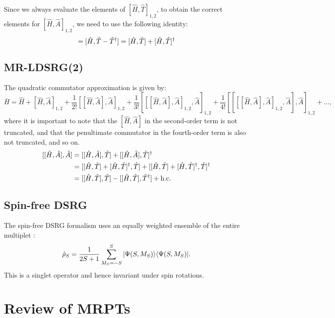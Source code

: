 \documentclass{article}
\begin{document}
Since we always evaluate the elements of $[\hat{H},\hat{T}]_{1,2}$, to obtain the correct elements for $[\hat{H},\hat{A}]_{1,2}$, we need to use the following identity:
\begin{equation}
    [\hat{H},\hat{A}]=[\hat{H},\hat{T}-\hat{T}\adj]=[\hat{H},\hat{T}]+[\hat{H},\hat{T}]\adj
\end{equation}

\subsection{MR-LDSRG(2)}
The quadratic commutator approximation is given by:\cite{neuscammanQuadraticCanonicalTransformation2009}
\begin{equation}
    \bar{H}=\hat{H}+[\hat{H},\hat{A}]_{1,2}+\frac{1}{2!}[[\hat{H},\hat{A}],\hat{A}]_{1,2}+\frac{1}{3!}[[[\hat{H},\hat{A}],\hat{A}]_{1,2},\hat{A}]_{1,2}+\frac{1}{4!}[[[[\hat{H},\hat{A}],\hat{A}]_{1,2},\hat{A}],\hat{A}]_{1,2}+\dots,
\end{equation}
where it is important to note that the $[\hat{H},\hat{A}]$ in the second-order term is not truncated, and that the penultimate commutator in the fourth-order term is also not truncated, and so on.
\begin{equation}
\begin{split}
[[\hat{H},\hat{A}],\hat{A}] &= [[\hat{H},\hat{A}],\hat{T}] + [[\hat{H},\hat{A}],\hat{T}]^{\dagger}\\
&= [[\hat{H},\hat{T}]+[\hat{H},\hat{T}]^{\dagger},\hat{T}] + [[\hat{H},\hat{T}]+[\hat{H},\hat{T}]^{\dagger},\hat{T}]^{\dagger}\\
&= [[\hat{H},\hat{T}],\hat{T}] - [[\hat{H},\hat{T}],\hat{T}^{\dagger}] + \mathrm{h.c.}
\end{split}
\end{equation}

\subsection{Spin-free DSRG}
The spin-free DSRG formalism uses an equally weighted ensemble of the entire multiplet \cite{liSpinfreeFormulationMultireference2021}:
\begin{equation}
    \hat{\rho}_S=\frac{1}{2S+1}\sum_{M_S=-S}^S|\Psi(S,M_S)\rangle\langle\Psi(S,M_S)|.
\end{equation}
This is a singlet operator and hence invariant under spin rotations.

\section{Review of MRPTs}
\end{document}
